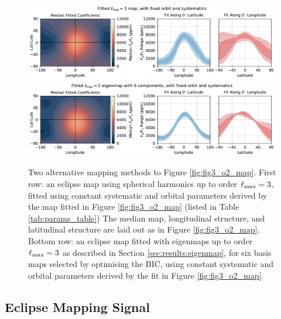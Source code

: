\documentclass[twocolumn]{aastex631}
\begin{document}
\begin{figure}
    \centering
    \includegraphics[width=\textwidth]{fig5a_o3.pdf}
    \includegraphics[width=\textwidth]{fig5b_eigenmap.pdf}
    \caption{Two alternative mapping methods to Figure \ref{fig:fig3_o2_map}. First row: an eclipse map using spherical harmonics up to order $\ell_{\rm max}=3$, fitted using constant systematic and orbital parameters derived by the map fitted in Figure \ref{fig:fig3_o2_map} (listed in Table \ref{tab:params_table}) The median map, longitudinal structure, and latitudinal structure are laid out as in Figure \ref{fig:fig3_o2_map}. Bottom row: an eclipse map fitted with eigenmaps up to order $\ell_{\rm max}=3$ as described in Section \ref{sec:results:eigenmap}, for six basis maps selected by optimising the BIC, using constant systematic and orbital parameters derived by the fit in Figure \ref{fig:fig3_o2_map}.}
    \label{fig:fig5_o3_map_eigenmap}
\end{figure}


\subsection{Eclipse Mapping Signal}\label{sec:result:signal}
\end{document}
